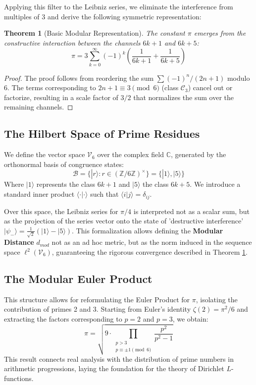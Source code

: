 \documentclass[12pt, a4paper]{article}
\theoremstyle{plain}
\newtheorem{theorem}{Theorem}[section]
\theoremstyle{definition}
\theoremstyle{remark}
\numberwithin{equation}{section}
\begin{document}
Applying this filter to the Leibniz series, we eliminate the interference from multiples of 3 and derive the following symmetric representation:

\begin{theorem}[Basic Modular Representation]
\label{thm:pi-modular}
The constant $\pi$ emerges from the constructive interaction between the channels $6k+1$ and $6k+5$:
\begin{equation}
\pi = 3\sum_{k=0}^{\infty} (-1)^k\left(\frac{1}{6k+1} + \frac{1}{6k+5}\right)
\end{equation}
\end{theorem}

\begin{proof}
The proof follows from reordering the sum $\sum (-1)^n/(2n+1)$ modulo 6. The terms corresponding to $2n+1 \equiv 3 \pmod 6$ (class $\mathcal{C}_3$) cancel out or factorize, resulting in a scale factor of $3/2$ that normalizes the sum over the remaining channels.
\end{proof}

\subsection{The Hilbert Space of Prime Residues}

We define the vector space $\mathcal{V}_6$ over the complex field $\mathbb{C}$, generated by the orthonormal basis of congruence states:
\begin{equation}
    \mathcal{B} = \{ |r\rangle : r \in (\mathbb{Z}/6\mathbb{Z})^\times \} = \{ |1\rangle, |5\rangle \}
\end{equation}
Where $|1\rangle$ represents the class $6k+1$ and $|5\rangle$ the class $6k+5$.
We introduce a standard inner product $\langle \cdot | \cdot \rangle$ such that $\langle i | j \rangle = \delta_{ij}$.

Over this space, the Leibniz series for $\pi/4$ is interpreted not as a scalar sum, but as the projection of the series vector onto the state of 'destructive interference' $|\psi_-\rangle = \frac{1}{\sqrt{2}}(|1\rangle - |5\rangle)$.
This formalization allows defining the \textbf{Modular Distance} $d_{mod}$ not as an ad hoc metric, but as the norm induced in the sequence space $\ell^2(\mathcal{V}_6)$, guaranteeing the rigorous convergence described in Theorem \ref{thm:pi-modular}.

\subsection{The Modular Euler Product}
This structure allows for reformulating the Euler Product for $\pi$, isolating the contribution of primes 2 and 3. Starting from Euler's identity $\zeta(2) = \pi^2/6$ and extracting the factors corresponding to $p=2$ and $p=3$, we obtain:
\begin{equation}
\pi = \sqrt{9 \cdot \prod_{\substack{p > 3 \\ p \equiv \pm 1 \pmod{6}}} \frac{p^2}{p^2 - 1}}
\end{equation}
This result connects real analysis with the distribution of prime numbers in arithmetic progressions, laying the foundation for the theory of Dirichlet $L$-functions.
\end{document}
